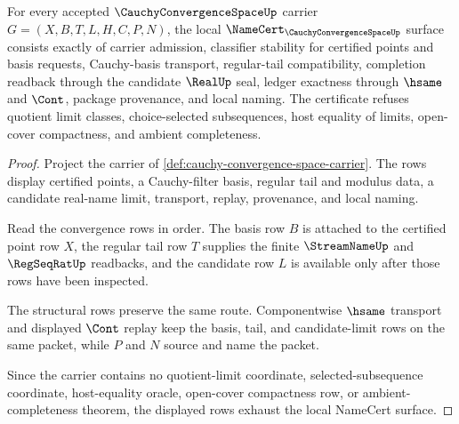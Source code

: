 \begin{theorem}
\label{thm:cauchy-convergence-space-namecert-obligations}
For every accepted $\CauchyConvergenceSpaceUp$ carrier $G=(X,B,T,L,H,C,P,N)$, the local $\NameCert_{\CauchyConvergenceSpaceUp}$ surface consists exactly of carrier admission, classifier stability for certified points and basis requests, Cauchy-basis transport, regular-tail compatibility, completion readback through the candidate $\RealUp$ seal, ledger exactness through $\hsame$ and $\Cont$, package provenance, and local naming. The certificate refuses quotient limit classes, choice-selected subsequences, host equality of limits, open-cover compactness, and ambient completeness.
\end{theorem}
\begin{proof}
Project the carrier of \autoref{def:cauchy-convergence-space-carrier}. The rows display certified points, a Cauchy-filter basis, regular tail and modulus data, a candidate real-name limit, transport, replay, provenance, and local naming.

Read the convergence rows in order. The basis row $B$ is attached to the certified point row $X$, the regular tail row $T$ supplies the finite $\StreamNameUp$ and $\RegSeqRatUp$ readbacks, and the candidate row $L$ is available only after those rows have been inspected.

The structural rows preserve the same route. Componentwise $\hsame$ transport and displayed $\Cont$ replay keep the basis, tail, and candidate-limit rows on the same packet, while $P$ and $N$ source and name the packet.

Since the carrier contains no quotient-limit coordinate, selected-subsequence coordinate, host-equality oracle, open-cover compactness row, or ambient-completeness theorem, the displayed rows exhaust the local NameCert surface.
\end{proof}

